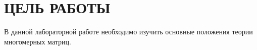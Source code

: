 \section{ЦЕЛЬ РАБОТЫ}

В данной лабораторной работе необходимо изучить основные положения
теории многомерных матриц.